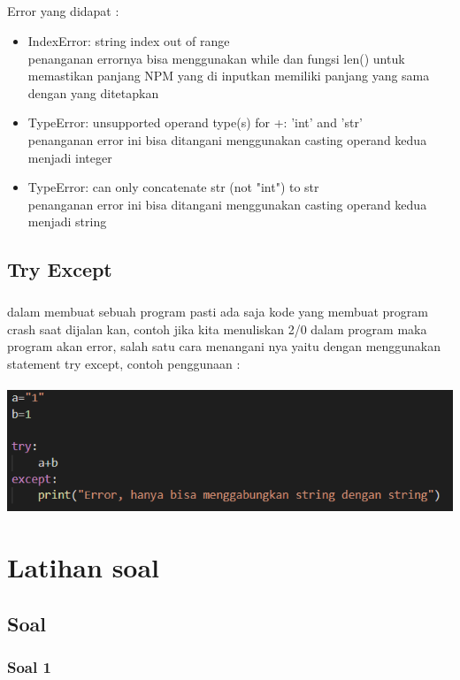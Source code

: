 \documentclass[a4paper,12pt]{report}
\begin{document}
\paragraph{}
Error yang didapat :
\begin{itemize}
	\item IndexError: string index out of range\\
	penanganan errornya bisa menggunakan while dan fungsi len() untuk memastikan panjang NPM yang di inputkan memiliki panjang yang sama dengan yang ditetapkan
	\item TypeError: unsupported operand type(s) for +: 'int' and 'str'\\
	penanganan error ini bisa ditangani menggunakan casting operand kedua menjadi integer
	\item TypeError: can only concatenate str (not "int") to str\\
	penanganan error ini bisa ditangani menggunakan casting operand kedua menjadi string
\end{itemize}
\section{Try Except}
\paragraph{}
 dalam membuat sebuah program pasti ada saja kode yang membuat program crash saat dijalan kan, contoh jika kita menuliskan 2/0 dalam program maka program akan error, salah satu cara menangani nya yaitu dengan menggunakan statement try except, contoh penggunaan :\\ \\
\includegraphics[scale=1]{images/try except.png} 
\chapter{Latihan soal}
\section{Soal}
\subsection{Soal 1}

\end{document}
